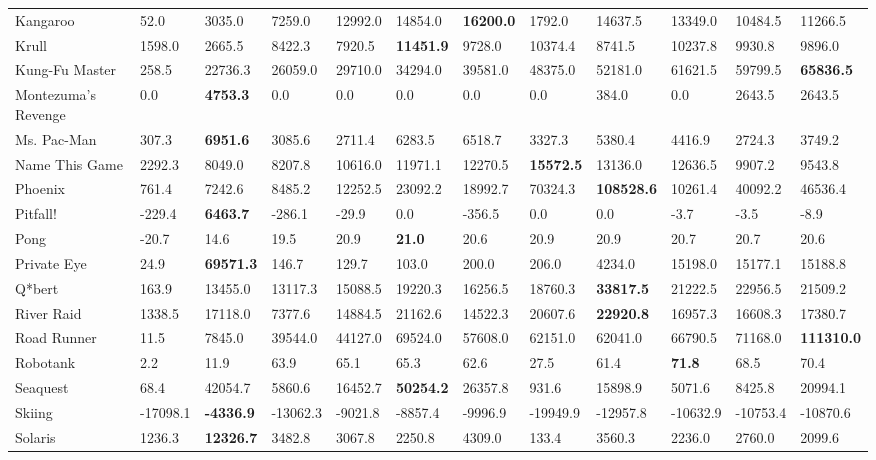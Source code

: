 \documentclass{article}
\begin{document}
\begin{table}[h]
\begin{scriptsize}
\begin{sc}
\begin{tabular}{| p{2.4cm} p{0.84cm} p{0.84cm} p{0.84cm} p{0.84cm} p{0.84cm} p{0.84cm} p{0.84cm} p{0.84cm} p{0.84cm} p{0.84cm} p{0.84cm} |}
Kangaroo & 52.0 & 3035.0 & 7259.0 & 12992.0 & 14854.0 & {\bf 16200.0} & 1792.0 & 14637.5 & 13349.0 & 10484.5 & 11266.5\\
Krull & 1598.0 & 2665.5 & 8422.3 & 7920.5 & {\bf 11451.9} & 9728.0 & 10374.4 & 8741.5 & 10237.8 & 9930.8 & 9896.0\\
Kung-Fu Master & 258.5 & 22736.3 & 26059.0 & 29710.0 & 34294.0 & 39581.0 & 48375.0 & 52181.0 & 61621.5 & 59799.5 & {\bf 65836.5}\\
Montezuma's Revenge & 0.0 & {\bf 4753.3} & 0.0 & 0.0 & 0.0 & 0.0 & 0.0 & 384.0 & 0.0 & 2643.5 & 2643.5\\
Ms. Pac-Man & 307.3 & {\bf 6951.6} & 3085.6 & 2711.4 & 6283.5 & 6518.7 & 3327.3 & 5380.4 & 4416.9 & 2724.3 & 3749.2\\
Name This Game & 2292.3 & 8049.0 & 8207.8 & 10616.0 & 11971.1 & 12270.5 & {\bf 15572.5} & 13136.0 & 12636.5 & 9907.2 & 9543.8\\
Phoenix & 761.4 & 7242.6 & 8485.2 & 12252.5 & 23092.2 & 18992.7 & 70324.3 & {\bf 108528.6} & 10261.4 & 40092.2 & 46536.4\\
Pitfall!  & -229.4 & {\bf 6463.7} & -286.1 & -29.9 & 0.0 & -356.5 & 0.0 & 0.0 & -3.7 & -3.5 & -8.9\\
Pong & -20.7 & 14.6 & 19.5 & 20.9 & {\bf 21.0} & 20.6 & 20.9 & 20.9 & 20.7 & 20.7 & 20.6\\
Private Eye & 24.9 & {\bf 69571.3} & 146.7 & 129.7 & 103.0 & 200.0 & 206.0 & 4234.0 & 15198.0 & 15177.1 & 15188.8\\
Q*bert & 163.9 & 13455.0 & 13117.3 & 15088.5 & 19220.3 & 16256.5 & 18760.3 & {\bf 33817.5} & 21222.5 & 22956.5 & 21509.2\\
River Raid & 1338.5 & 17118.0 & 7377.6 & 14884.5 & 21162.6 & 14522.3 & 20607.6 & {\bf 22920.8} & 16957.3 & 16608.3 & 17380.7\\
Road Runner & 11.5 & 7845.0 & 39544.0 & 44127.0 & 69524.0 & 57608.0 & 62151.0 & 62041.0 & 66790.5 & 71168.0 & {\bf 111310.0}\\
Robotank & 2.2 & 11.9 & 63.9 & 65.1 & 65.3 & 62.6 & 27.5 & 61.4 & {\bf 71.8} & 68.5 & 70.4\\
Seaquest & 68.4 & 42054.7 & 5860.6 & 16452.7 & {\bf 50254.2} & 26357.8 & 931.6 & 15898.9 & 5071.6 & 8425.8 & 20994.1\\
Skiing & -17098.1 & {\bf -4336.9} & -13062.3 & -9021.8 & -8857.4 & -9996.9 & -19949.9 & -12957.8 & -10632.9 & -10753.4 & -10870.6\\
Solaris & 1236.3 & {\bf 12326.7} & 3482.8 & 3067.8 & 2250.8 & 4309.0 & 133.4 & 3560.3 & 2236.0 & 2760.0 & 2099.6\\

\end{tabular}
\end{sc}
\end{scriptsize}
\end{table}
\end{document}
